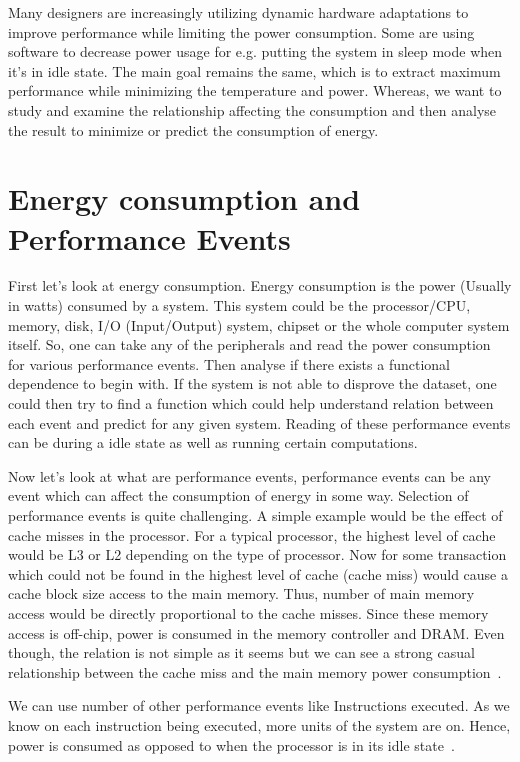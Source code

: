 Many designers are increasingly utilizing dynamic hardware adaptations to improve performance while limiting the power consumption. Some are using software to decrease power usage for e.g. putting the system in sleep mode when it's in idle state. The main goal remains the same, which is to extract maximum performance while minimizing the temperature and power. Whereas, we want to study and examine the relationship affecting the consumption and then analyse the result to minimize or predict the consumption of energy.

\section{Energy consumption and Performance Events}

First let's look at energy consumption. Energy consumption is the power (Usually in watts) consumed by a system. This system could be the processor/CPU, memory, disk, I/O (Input/Output) system, chipset or the whole computer system itself. So, one can take any of the peripherals and read the power consumption for various performance events. Then analyse if there exists a functional dependence to begin with. If the system is not able to disprove the dataset, one could then try to find a function which could help understand relation between each event and predict for any given system. Reading of these performance events can be during a idle state as well as running certain computations.

Now let's look at what are performance events, performance events can be any event which can affect the consumption of energy in some way. Selection of performance events is quite challenging. A simple example would be the effect of cache misses in the processor. For a typical processor, the highest level of cache would be L3 or L2 depending on the type of processor. Now for some transaction which could not be found in the highest level of cache (cache miss) would cause a cache block size access to the main memory. Thus, number of main memory access would be directly proportional to the cache misses. Since these memory access is off-chip, power is consumed in the memory controller and DRAM. Even though, the relation is not simple as it seems but we can see a strong casual relationship between the cache miss and the main memory power consumption~\cite{bircher2007complete}.

We can use number of other performance events like Instructions executed. As we know on each instruction being executed, more units of the system are on. Hence, power is consumed as opposed to when the processor is in its idle state~\cite{gilberto2005power}. 

